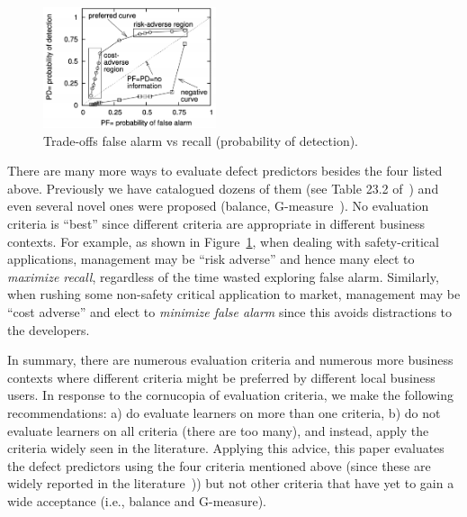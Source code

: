 \documentclass[sigconf]{acmart}
\theoremstyle{break}
\theoremstyle{break}
\begin{document}
 \begin{figure}
\begin{center}
\includegraphics[width=2.0in]{roc.png}
\end{center}
\vspace{-0.2cm}
\caption{Trade-offs false alarm vs
recall (probability of detection).  }\label{fig:trade}
 \end{figure}
There are many more ways to evaluate defect predictors besides the four listed above.
Previously we have catalogued dozens of them (see Table 23.2 of~\cite{menzies2014sharing}) and even several novel ones were proposed
(balance, G-measure~\cite{menzies2007data}).  
No evaluation criteria is ``best'' since different  criteria are appropriate in different business contexts. For example, as shown
in 
Figure~\ref{fig:trade},
when dealing
with safety-critical applications, management may be
``risk adverse'' and hence many elect
 to {\em maximize recall}, regardless of the time wasted exploring  false alarm.
 Similarly, 
when rushing some non-safety critical application to market, management may be ``cost adverse''
and elect to {\em minimize false alarm} since this avoids distractions to the developers. 

In summary, there are  numerous evaluation criteria and  numerous more business contexts
where different criteria might be preferred by different local business users. In response to
the cornucopia of evaluation criteria, we make the following recommendations: a) do evaluate learners on more than one criteria, b) do not evaluate learners on  all criteria (there are too many), and instead, apply the criteria widely seen in the literature. Applying this advice, this paper  evaluates the defect predictors using the four criteria
mentioned above (since these are widely reported in the literature~\cite{ghotra2015revisiting,fu2016tuning})) but not other 
 criteria  that  have yet to gain a wide acceptance 
 (i.e., balance and G-measure).
 
\end{document}
